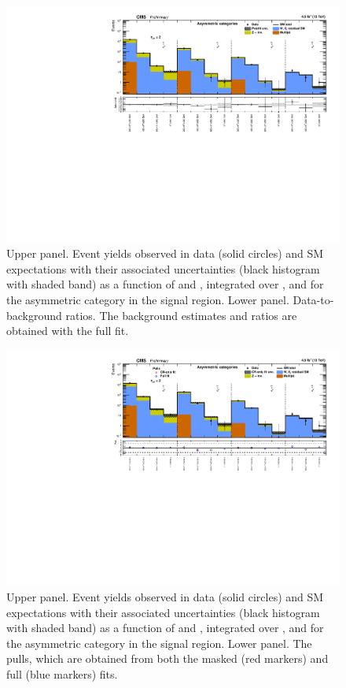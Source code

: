 \clearpage
\begin{figure}[h!]
  \centering
  \caption{Upper panel. Event yields observed in data (solid circles)
    and SM expectations with their associated uncertainties (black
    histogram with shaded band) as a function of \nb and \scalht,
    integrated over \mht, and for the asymmetric \njet category
    in the signal region. Lower panel. Data-to-background ratios. The
    background estimates and ratios are obtained with the full fit. }
  \label{fig:mr_asym_post}
  \includegraphics[width=1.\linewidth]{figures/results/asym/summaryPlot_Asymmetric_fit_b}
\end{figure}

\clearpage
\begin{figure}[h!]
  \centering
  \caption{Upper panel. Event yields observed in data (solid circles)
    and SM expectations with their associated uncertainties (black
    histogram with shaded band) as a function of \nb and \scalht,
    integrated over \mht, and for the asymmetric \njet category
    in the signal region. Lower panel. The pulls, which are obtained
    from both the masked (red markers) and full (blue markers) fits. }
  \label{fig:mr_asym_pulls}
  \includegraphics[width=1.\linewidth]{figures/results/asym/summaryPlot_Asymmetric_prefit_overlay_fit_b}
\end{figure}


